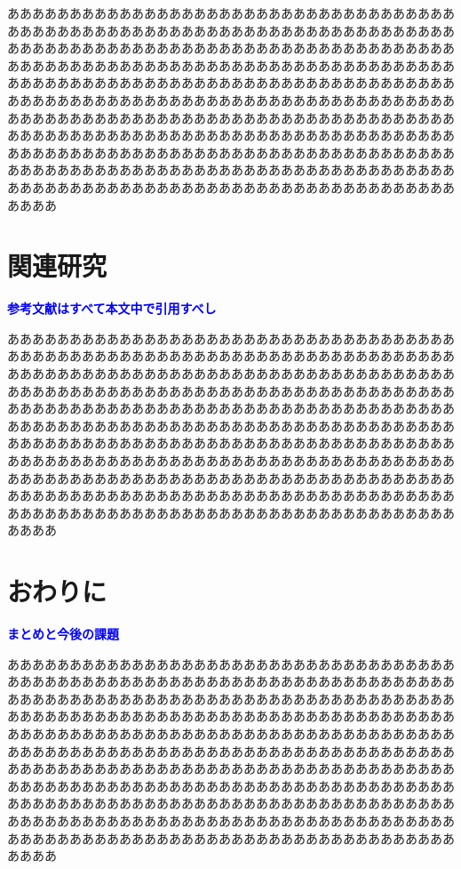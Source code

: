 \documentclass[dvipdfmx]{cs-handout}
\newcommand{\Note}[1]{\noindent \textbf{\textcolor{blue}{#1}}}
\begin{document}
ああああああああああああああああああああああああああああああああああああ
ああああああああああああああああああああああああああああああああああああ
ああああああああああああああああああああああああああああああああああああ
ああああああああああああああああああああああああああああああああああああ
ああああああああああああああああああああああああああああああああああああ
ああああああああああああああああああああああああああああああああああああ
ああああああああああああああああああああああああああああああああああああ
ああああああああああああああああああああああああああああああああああああ
ああああああああああああああああああああああああああああああああああああ
ああああああああああああああああああああああああああああああああああああ
ああああああああああああああああああああああああああああああああああああ
ああああ

\section{関連研究}
\Note{参考文献はすべて本文中で引用すべし}

ああああああああああああああああああああああああああああああああああああ
ああああああああああああああああああああああああああああああああああああ
ああああああああああああああああああああああああああああああああああああ
ああああああああああああああああああああああああああああああああああああ
ああああああああああああああああああああああああああああああああああああ
ああああああああああああああああああああああああああああああああああああ
ああああああああああああああああああああああああああああああああああああ
ああああああああああああああああああああああああああああああああああああ
ああああああああああああああああああああああああああああああああああああ
ああああああああああああああああああああああああああああああああああああ
ああああああああああああああああああああああああああああああああああああ
ああああ

\section{おわりに}
\Note{まとめと今後の課題}

ああああああああああああああああああああああああああああああああああああ
ああああああああああああああああああああああああああああああああああああ
ああああああああああああああああああああああああああああああああああああ
ああああああああああああああああああああああああああああああああああああ
ああああああああああああああああああああああああああああああああああああ
ああああああああああああああああああああああああああああああああああああ
ああああああああああああああああああああああああああああああああああああ
ああああああああああああああああああああああああああああああああああああ
ああああああああああああああああああああああああああああああああああああ
ああああああああああああああああああああああああああああああああああああ
ああああああああああああああああああああああああああああああああああああ
ああああ
\end{document}
